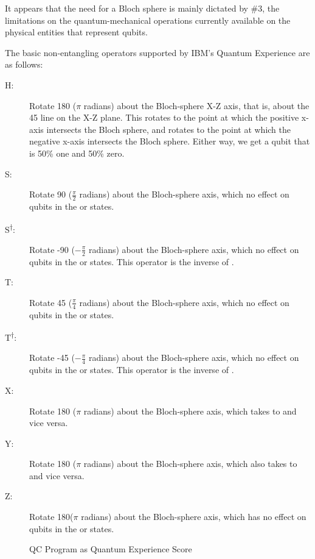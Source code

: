 It appears that the need for a Bloch sphere is mainly dictated by \#3,
the limitations on the quantum-mechanical operations currently available
on the physical entities that represent qubits.

The basic non-entangling operators supported by IBM's Quantum Experience
are as follows:

\begin{description}
\item[H:]
	Rotate 180{\textdegree} ($\pi$ radians) about the Bloch-sphere
	X-Z axis, that is, about the {45\textdegree} line on the
	X-Z plane.  This rotates  to the point at which the
	positive x-axis intersects the Bloch sphere, and rotates 
	to the point at which the negative x-axis intersects the Bloch
	sphere.
	Either way, we get a qubit that is 50\% one and 50\% zero.
\item[S:]
	Rotate {90\textdegree} ($\frac{\pi}{2}$ radians) about the
	Bloch-sphere  axis, which no effect on qubits in the
	 or  states.
\item[S\textsuperscript{$\dagger$}:]
	Rotate {-90\textdegree} ($-\frac{\pi}{2}$ radians) about the
	Bloch-sphere  axis, which no effect on qubits in the
	 or  states.
	This operator is the inverse of .
\item[T:]
	Rotate {45\textdegree} ($\frac{\pi}{4}$ radians) about the
	Bloch-sphere  axis, which no effect on qubits in the
	 or  states.
\item[T\textsuperscript{$\dagger$}:]
	Rotate {-45\textdegree} ($-\frac{\pi}{4}$ radians) about the
	Bloch-sphere  axis, which no effect on qubits in the
	 or  states.
	This operator is the inverse of .
\item[X:]
	Rotate {180\textdegree} ($\pi$ radians) about the Bloch-sphere
	 axis, which takes  to  and vice versa.
\item[Y:]
	Rotate {180\textdegree} ($\pi$ radians) about the Bloch-sphere
	 axis, which also takes  to  and vice versa.
\item[Z:]
	Rotate 180\textdegree ($\pi$ radians) about the Bloch-sphere
	 axis, which has no effect on qubits in the  or
	 states.
\end{description}

\begin{figure}[tb]
\centering
{}
\caption{QC Program as Quantum Experience Score}
\label{fig:future:QC Program as Quantum Experience Score}
\end{figure}

